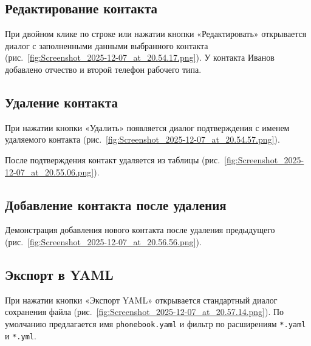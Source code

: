 

\subsection{Редактирование контакта}

При двойном клике по строке или нажатии кнопки «Редактировать» открывается диалог с заполненными данными выбранного контакта (рис.~\ref{fig:Screenshot_2025-12-07_at_20.54.17.png}). У контакта Иванов добавлено отчество и второй телефон рабочего типа.


\subsection{Удаление контакта}

При нажатии кнопки «Удалить» появляется диалог подтверждения с именем удаляемого контакта (рис.~\ref{fig:Screenshot_2025-12-07_at_20.54.57.png}).


После подтверждения контакт удаляется из таблицы (рис.~\ref{fig:Screenshot_2025-12-07_at_20.55.06.png}).


\subsection{Добавление контакта после удаления}

Демонстрация добавления нового контакта после удаления предыдущего (рис.~\ref{fig:Screenshot_2025-12-07_at_20.56.56.png}).


\subsection{Экспорт в YAML}

При нажатии кнопки «Экспорт YAML» открывается стандартный диалог сохранения файла (рис.~\ref{fig:Screenshot_2025-12-07_at_20.57.14.png}). По умолчанию предлагается имя \texttt{phonebook.yaml} и фильтр по расширениям \texttt{*.yaml} и \texttt{*.yml}.


